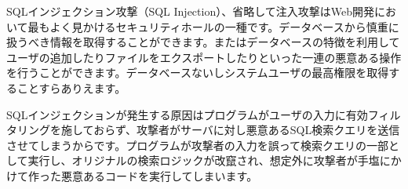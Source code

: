 SQLインジェクション攻撃（SQL Injection）、省略して注入攻撃はWeb開発において最もよく見かけるセキュリティホールの一種です。データベースから慎重に扱うべき情報を取得することができます。またはデータベースの特徴を利用してユーザの追加したりファイルをエクスポートしたりといった一連の悪意ある操作を行うことができます。データベースないしシステムユーザの最高権限を取得することすらありえます。

SQLインジェクションが発生する原因はプログラムがユーザの入力に有効フィルタリングを施しておらず、攻撃者がサーバに対し悪意あるSQL検索クエリを送信させてしまうからです。プログラムが攻撃者の入力を誤って検索クエリの一部として実行し、オリジナルの検索ロジックが改竄され、想定外に攻撃者が手塩にかけて作った悪意あるコードを実行してしまいます。
